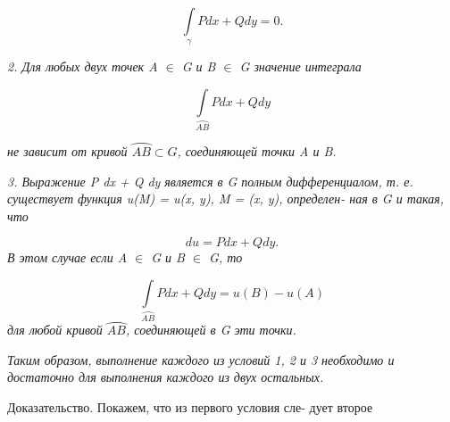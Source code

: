 \documentclass[10pt]{book}
\begin{document}
	$$ \int\limits_{\gamma} P dx + Q dy = 0.$$
	
	 \textit{2. Для любых двух точек A  $\in$ G и B $\in$ G значение интеграла} \linebreak 
	
	$$\int\limits_{\wideparen{AB}} P dx + Q dy$$
	
	\textit{не зависит от кривой $\wideparen{AB} \subset G$, соединяющей точки A и B.} \par 
	\textit{3. Выражение P dx + Q dy является в G полным дифференциалом,\linebreak
	т. е. существует функция u(M) = u(x, y), M = (x, y), определен-\linebreak
	ная в G и такая, что} \par
	
	$$du=P dx + Q dy.$$
	\textit{В этом случае если A  $\in$ G и B $\in$ G, то}\par 
	
	$$ \int\limits_{\wideparen{AB}} P dx + Q dy = u \left( B \right) - u \left( A \right) $$
	\textit{для любой кривой $\wideparen{AB}$, соединяющей в G эти точки.} \par 
	\textit{Таким образом, выполнение каждого из условий 1, 2 и 3 необходимо \linebreak и достаточно для выполнения каждого из двух остальных.} \par
	
	Доказательство. Покажем, что из первого условия сле- \linebreak
	дует второе
	
\end{document}
